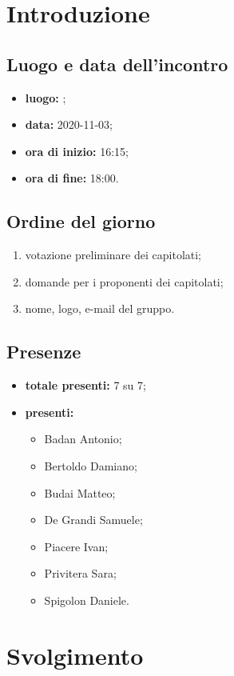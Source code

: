 \section*{Introduzione}
\subsection*{Luogo e data dell'incontro}
\begin{itemize}
	\item \textbf{luogo:} ;
	\item \textbf{data:} 2020-11-03;
	\item \textbf{ora di inizio:} 16:15;
	\item \textbf{ora di fine:} 18:00.
\end{itemize}

\subsection*{Ordine del giorno}
\begin{enumerate}
	\item votazione preliminare dei capitolati;
	\item domande per i proponenti dei capitolati;
	\item nome, logo, e-mail del gruppo.
\end{enumerate}

\subsection*{Presenze}
\begin{itemize}
	\item \textbf{totale presenti:} 7 su 7;
	\item \textbf{presenti: }
	\begin{itemize}
		\item Badan Antonio;
		\item Bertoldo Damiano;
		\item Budai Matteo;
		\item De Grandi Samuele;
		\item Piacere Ivan;
		\item Privitera Sara;
		\item Spigolon Daniele.
	\end{itemize}
\end{itemize}

\newpage

\section*{Svolgimento}
